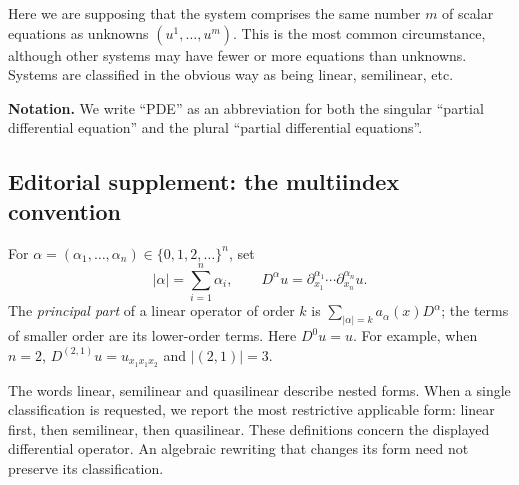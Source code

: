 Here we are supposing that the system comprises the same number $m$ of
scalar equations as unknowns $(u^1,\ldots,u^m)$. This is the most common
circumstance, although other systems may have fewer or more equations than
unknowns. Systems are classified in the obvious way as being linear,
semilinear, etc.

\noindent\textbf{Notation.}
We write ``PDE'' as an abbreviation for both the singular ``partial
differential equation'' and the plural ``partial differential equations''.

\subsection*{Editorial supplement: the multiindex convention}
For $\alpha=(\alpha_1,\ldots,\alpha_n)\in\{0,1,2,\ldots\}^n$, set
\[
 |\alpha|=\sum_{i=1}^n\alpha_i,\qquad
 D^\alpha u=\partial_{x_1}^{\alpha_1}\cdots\partial_{x_n}^{\alpha_n}u.
\]
The \emph{principal part} of a linear operator of order $k$ is
$\sum_{|\alpha|=k}a_\alpha(x)D^\alpha$; the terms of smaller order are its
lower-order terms. Here $D^0u=u$. For example, when $n=2$,
$D^{(2,1)}u=u_{x_1x_1x_2}$ and $|(2,1)|=3$.

The words linear, semilinear and quasilinear describe nested forms.
When a single classification is requested, we report the most restrictive
applicable form: linear first, then semilinear, then quasilinear.
These definitions concern the displayed differential operator. An algebraic
rewriting that changes its form need not preserve its classification.
\par\Needspace{65mm}
